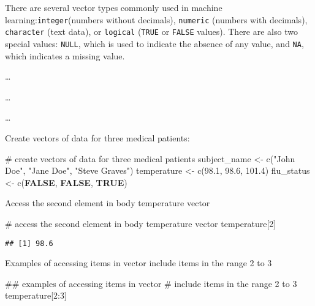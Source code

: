 \documentclass[
]{article}
\newenvironment{Shaded}{\begin{snugshade}}{\end{snugshade}}
\newcommand{\CommentTok}[1]{\textcolor[rgb]{0.50,0.62,0.50}{#1}}
\newcommand{\ConstantTok}[1]{\textcolor[rgb]{0.86,0.64,0.64}{\textbf{#1}}}
\newcommand{\DecValTok}[1]{\textcolor[rgb]{0.86,0.86,0.80}{#1}}
\newcommand{\DocumentationTok}[1]{\textcolor[rgb]{0.50,0.62,0.50}{#1}}
\newcommand{\FloatTok}[1]{\textcolor[rgb]{0.75,0.75,0.82}{#1}}
\newcommand{\FunctionTok}[1]{\textcolor[rgb]{0.94,0.94,0.56}{#1}}
\newcommand{\NormalTok}[1]{\textcolor[rgb]{0.80,0.80,0.80}{#1}}
\newcommand{\OtherTok}[1]{\textcolor[rgb]{0.94,0.94,0.56}{#1}}
\newcommand{\SpecialCharTok}[1]{\textcolor[rgb]{0.86,0.64,0.64}{#1}}
\newcommand{\StringTok}[1]{\textcolor[rgb]{0.80,0.58,0.58}{#1}}
\begin{document}
There are several vector types commonly used in machine
learning:\texttt{integer}(numbers without decimals), \texttt{numeric}
(numbers with decimals), \texttt{character} (text data), or
\texttt{logical} (\texttt{TRUE} or \texttt{FALSE} values). There are
also two special values: \texttt{NULL}, which is used to indicate the
absence of any value, and \texttt{NA}, which indicates a missing value.

\ldots{}

\ldots{}

\ldots{}

Create vectors of data for three medical patients:

\begin{Shaded}
\begin{Highlighting}[]
\CommentTok{\# create vectors of data for three medical patients}
\NormalTok{subject\_name }\OtherTok{\textless{}{-}} \FunctionTok{c}\NormalTok{(}\StringTok{"John Doe"}\NormalTok{, }\StringTok{"Jane Doe"}\NormalTok{, }\StringTok{"Steve Graves"}\NormalTok{)}
\NormalTok{temperature }\OtherTok{\textless{}{-}} \FunctionTok{c}\NormalTok{(}\FloatTok{98.1}\NormalTok{, }\FloatTok{98.6}\NormalTok{, }\FloatTok{101.4}\NormalTok{)}
\NormalTok{flu\_status }\OtherTok{\textless{}{-}} \FunctionTok{c}\NormalTok{(}\ConstantTok{FALSE}\NormalTok{, }\ConstantTok{FALSE}\NormalTok{, }\ConstantTok{TRUE}\NormalTok{)}
\end{Highlighting}
\end{Shaded}

Access the second element in body temperature vector

\begin{Shaded}
\begin{Highlighting}[]
\CommentTok{\# access the second element in body temperature vector}
\NormalTok{temperature[}\DecValTok{2}\NormalTok{]}
\end{Highlighting}
\end{Shaded}

\begin{verbatim}
## [1] 98.6
\end{verbatim}

Examples of accessing items in vector include items in the range 2 to 3

\begin{Shaded}
\begin{Highlighting}[]
\DocumentationTok{\#\# examples of accessing items in vector}
\CommentTok{\# include items in the range 2 to 3}
\NormalTok{temperature[}\DecValTok{2}\SpecialCharTok{:}\DecValTok{3}\NormalTok{]}
\end{Highlighting}
\end{Shaded}
\end{document}
